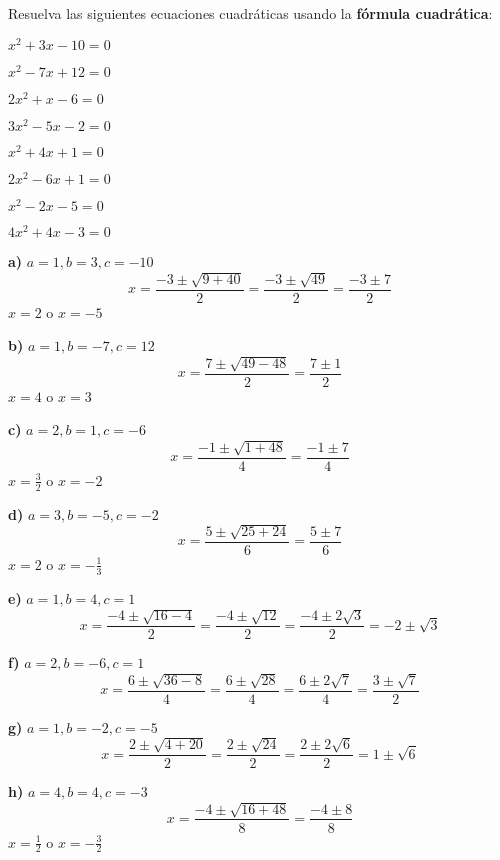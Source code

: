 \begin{exercise}
\problem Resuelva las siguientes ecuaciones cuadráticas usando la \textbf{fórmula cuadrática}:

\begin{exerciselist}
    \item $x^2 + 3x - 10 = 0$
    \item $x^2 - 7x + 12 = 0$
    \item $2x^2 + x - 6 = 0$
    \item $3x^2 - 5x - 2 = 0$
    \item $x^2 + 4x + 1 = 0$
    \item $2x^2 - 6x + 1 = 0$
    \item $x^2 - 2x - 5 = 0$
    \item $4x^2 + 4x - 3 = 0$
\end{exerciselist}

\begin{solucion}
\textbf{a)} $a = 1, b = 3, c = -10$
$$x = \frac{-3 \pm \sqrt{9 + 40}}{2} = \frac{-3 \pm \sqrt{49}}{2} = \frac{-3 \pm 7}{2}$$
$x = 2$ o $x = -5$

\textbf{b)} $a = 1, b = -7, c = 12$
$$x = \frac{7 \pm \sqrt{49 - 48}}{2} = \frac{7 \pm 1}{2}$$
$x = 4$ o $x = 3$

\textbf{c)} $a = 2, b = 1, c = -6$
$$x = \frac{-1 \pm \sqrt{1 + 48}}{4} = \frac{-1 \pm 7}{4}$$
$x = \frac{3}{2}$ o $x = -2$

\textbf{d)} $a = 3, b = -5, c = -2$
$$x = \frac{5 \pm \sqrt{25 + 24}}{6} = \frac{5 \pm 7}{6}$$
$x = 2$ o $x = -\frac{1}{3}$

\textbf{e)} $a = 1, b = 4, c = 1$
$$x = \frac{-4 \pm \sqrt{16 - 4}}{2} = \frac{-4 \pm \sqrt{12}}{2} = \frac{-4 \pm 2\sqrt{3}}{2} = -2 \pm \sqrt{3}$$

\textbf{f)} $a = 2, b = -6, c = 1$
$$x = \frac{6 \pm \sqrt{36 - 8}}{4} = \frac{6 \pm \sqrt{28}}{4} = \frac{6 \pm 2\sqrt{7}}{4} = \frac{3 \pm \sqrt{7}}{2}$$

\textbf{g)} $a = 1, b = -2, c = -5$
$$x = \frac{2 \pm \sqrt{4 + 20}}{2} = \frac{2 \pm \sqrt{24}}{2} = \frac{2 \pm 2\sqrt{6}}{2} = 1 \pm \sqrt{6}$$

\textbf{h)} $a = 4, b = 4, c = -3$
$$x = \frac{-4 \pm \sqrt{16 + 48}}{8} = \frac{-4 \pm 8}{8}$$
$x = \frac{1}{2}$ o $x = -\frac{3}{2}$
\end{solucion}
\end{exercise}

